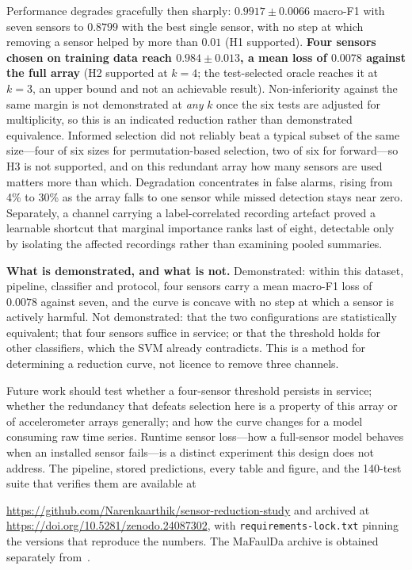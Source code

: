 \documentclass[conference]{IEEEtran}
\begin{document}
Performance degrades gracefully then sharply: $0.9917 \pm 0.0066$ macro-F1 with
seven sensors to $0.8799$ with the best single sensor, with no step at which
removing a sensor helped by more than $0.01$ (H1 supported). \textbf{Four
sensors chosen on training data reach $0.984 \pm 0.013$, a mean loss of
$0.0078$ against the full array} (H2 supported at $k=4$; the test-selected
oracle reaches it at $k=3$, an upper bound and not an achievable result). Non-inferiority against the same margin is not demonstrated at \emph{any} $k$
once the six tests are adjusted for multiplicity, so this is an indicated
reduction rather than demonstrated equivalence. Informed selection did
not reliably beat a
typical subset of the same size---four of six sizes for permutation-based
selection, two of six for forward---so H3 is not supported, and on this
redundant array how many sensors are used matters more than which. Degradation
concentrates in false alarms, rising from 4\% to 30\% as the array falls to one
sensor while missed detection stays near zero. Separately, a channel carrying a
label-correlated recording artefact proved a learnable shortcut that marginal
importance ranks last of eight, detectable only by isolating the affected
recordings rather than examining pooled summaries.

\textbf{What is demonstrated, and what is not.} Demonstrated: within this dataset, pipeline, classifier and protocol, four
sensors carry a mean macro-F1 loss of $0.0078$ against seven, and the curve is
concave with no step at which a sensor is actively harmful. Not demonstrated:
that the two configurations are statistically equivalent; that four sensors
suffice in service; or that the threshold holds for other classifiers, which
the SVM already contradicts. This is a method for determining a reduction
curve, not licence to remove three channels.

Future work should test whether a four-sensor threshold persists in service;
whether the redundancy that defeats selection here is a property of this array
or of accelerometer arrays generally; and how the curve changes for a model
consuming raw time series. Runtime sensor loss---how a full-sensor model
behaves when an installed sensor fails---is a distinct experiment this design
does not address. The pipeline, stored predictions, every table and figure,
and the 140-test suite that verifies them are available at

\url{https://github.com/Narenkaarthik/sensor-reduction-study}
and archived at \url{https://doi.org/10.5281/zenodo.24087302}, with
\texttt{requirements-lock.txt} pinning the versions that reproduce the
numbers. The MaFaulDa archive is obtained separately from~\cite{mafaulda}.
\end{document}
